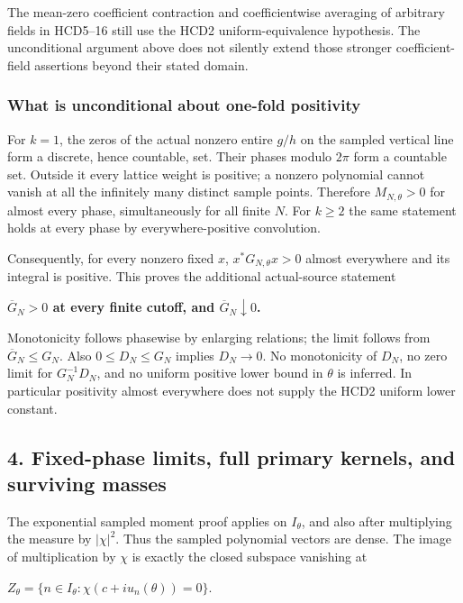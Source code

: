 The mean-zero coefficient contraction and coefficientwise averaging of arbitrary fields in HCD5--16 still use the HCD2 uniform-equivalence hypothesis. The unconditional argument above does not silently extend those stronger coefficient-field assertions beyond their stated domain.

\subsubsection{What is unconditional about one-fold positivity}\label{what-is-unconditional-about-one-fold-positivity}

For \(k=1\), the zeros of the actual nonzero entire \(g/h\) on the sampled vertical line form a discrete, hence countable, set. Their phases modulo \(2\pi\) form a countable set. Outside it every lattice weight is positive; a nonzero polynomial cannot vanish at all the infinitely many distinct sample points. Therefore \(M_{N,\theta}>0\) for almost every phase, simultaneously for all finite \(N\). For \(k\ge2\) the same statement holds at every phase by everywhere-positive convolution.

Consequently, for every nonzero fixed \(x\), \(x^*G_{N,\theta}x>0\) almost everywhere and its integral is positive. This proves the additional actual-source statement

\textbf{\(\overline G_N>0\) at every finite cutoff, and \(\overline G_N\downarrow0\).}

Monotonicity follows phasewise by enlarging relations; the limit follows from \(\overline G_N\le G_N\). Also \(0\le D_N\le G_N\) implies \(D_N\longrightarrow0\). No monotonicity of \(D_N\), no zero limit for \(G_N^{-1}D_N\), and no uniform positive lower bound in \(\theta\) is inferred. In particular positivity almost everywhere does not supply the HCD2 uniform lower constant.

\subsection{4. Fixed-phase limits, full primary kernels, and surviving masses}\label{fixed-phase-limits-full-primary-kernels-and-surviving-masses}

The exponential sampled moment proof applies on \(I_\theta\), and also after multiplying the measure by \(|\chi|^2\). Thus the sampled polynomial vectors are dense. The image of multiplication by \(\chi\) is exactly the closed subspace vanishing at

\(Z_\theta=\{n\in I_\theta:\chi(c+iu_n(\theta))=0\}\).

